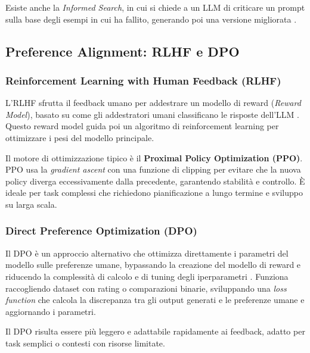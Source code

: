             Esiste anche la \textit{Informed Search}, in cui si chiede a un LLM di criticare un prompt sulla base degli esempi in cui ha fallito, generando poi una versione migliorata .

    \subsection{Preference Alignment: RLHF e DPO}

        \subsubsection{Reinforcement Learning with Human Feedback (RLHF)}
        
            L'RLHF sfrutta il feedback umano per addestrare un modello di reward (\textit{Reward Model}), basato su come gli addestratori umani classificano le risposte dell'LLM . Questo reward model guida poi un algoritmo di reinforcement learning per ottimizzare i pesi del modello principale. 

            Il motore di ottimizzazione tipico è il \textbf{Proximal Policy Optimization (PPO)}. PPO usa la \textit{gradient ascent} con una funzione di clipping per evitare che la nuova policy diverga eccessivamente dalla precedente, garantendo stabilità e controllo. È ideale per task complessi che richiedono pianificazione a lungo termine e sviluppo su larga scala.

        \subsubsection{Direct Preference Optimization (DPO)}
        
            Il DPO è un approccio alternativo che ottimizza direttamente i parametri del modello sulle preferenze umane, bypassando la creazione del modello di reward e riducendo la complessità di calcolo e di tuning degli iperparametri . Funziona raccogliendo dataset con rating o comparazioni binarie, sviluppando una \textit{loss function} che calcola la discrepanza tra gli output generati e le preferenze umane e aggiornando i parametri.
            
            Il DPO risulta essere più leggero e adattabile rapidamente ai feedback, adatto per task semplici o contesti con risorse limitate.